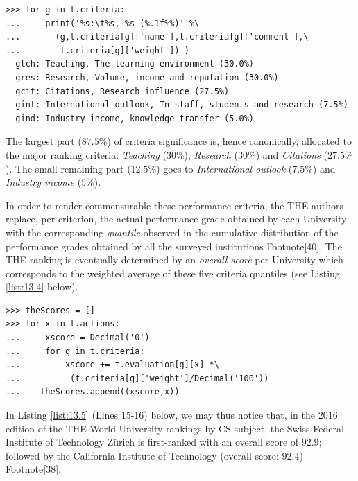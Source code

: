 \begin{lstlisting}
>>> for g in t.criteria:
...     print('%s:\t%s, %s (%.1f%%)' %\
...       (g,t.criteria[g]['name'],t.criteria[g]['comment'],\
...        t.criteria[g]['weight']) )  
  gtch:	Teaching, The learning environment (30.0%)
  gres:	Research, Volume, income and reputation (30.0%)
  gcit:	Citations, Research influence (27.5%)
  gint:	International outlook, In staff, students and research (7.5%)
  gind:	Industry income, knowledge transfer (5.0%)
\end{lstlisting}

The largest part ($87.5\%$) of criteria significance is, hence canonically, allocated to the major ranking criteria: \emph{Teaching} ($30\%$), \emph{Research} ($30\%$) and \emph{Citations} ($27.5\%$). The small remaining part ($12.5\%$) goes to \emph{International outlook} ($7.5\%$) and \emph{Industry income} ($5\%$).

In order to render commensurable these performance criteria, the THE authors replace, per criterion, the actual performance grade obtained by each University with the corresponding \emph{quantile} observed in the cumulative distribution of the performance grades obtained by all the surveyed institutions Footnote[40]. The THE ranking is eventually determined by an \emph{overall score} per University which corresponds to the weighted average of these five criteria quantiles (see Listing \ref{list:13.4} below).       

\begin{lstlisting}[caption={Computing the THE overall scores},label=list:13.4]
>>> theScores = []
>>> for x in t.actions:
...     xscore = Decimal('0')
...     for g in t.criteria:
...         xscore += t.evaluation[g][x] *\
...          (t.criteria[g]['weight']/Decimal('100'))
...	   theScores.append((xscore,x))
\end{lstlisting}

In Listing \ref{list:13.5} (Lines 15-16) below, we may thus notice that, in the 2016 edition of the THE World University rankings by CS subject, the Swiss Federal Institute of Technology Zürich is first-ranked with an overall score of $92.9$; followed by the California Institute of Technology (overall score: $92.4$) Footnote[38].

